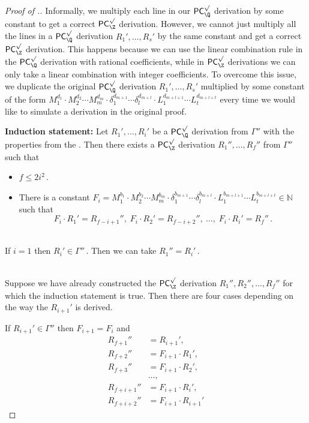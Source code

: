 \documentclass{toc}
\begin{document}
\begin{proof}[Proof of .]
Informally, we multiply each line in our  $\mathsf{PC}_{\Q}^{\surd}$ derivation by some constant to get a correct $\mathsf{PC}_{\Z}^{\surd}$ derivation. However, we cannot just multiply all the lines in a $\mathsf{PC}_{\Q}^{\surd}$ derivation %
$R_1', \ldots, R_s'$ %
 by the same constant and get a correct  $\mathsf{PC}_{\Z}^{\surd}$ derivation. This happens because we can use the linear combination rule in the  $\mathsf{PC}_{\Q}^{\surd}$ derivation with rational coefficients, while in   $\mathsf{PC}_{\Z}^{\surd}$ derivations we can only take a linear combination with integer coefficients. To overcome this issue, we duplicate the original $\mathsf{PC}_{\Q}^{\surd}$ derivation %
$R_1', \ldots, R_s'$ %
  multiplied by some constant of the form $M_1^{d_1} \cdot M_2^{d_2} \cdots M_m^{d_m} \cdot \delta_1^{d_{m + 1}} \cdots \delta_l^{d_{m + l}} \cdot  L_1^{d_{m + l + 1}} \cdots L_t^{d_{m + l + t}}$  every time we would like to simulate a derivation in the original proof.
%

\noindent\textbf{Induction statement:} Let %
$R_1', \ldots, R_i'$ %
 be a $\mathsf{PC}_{\Q}^{\surd}$ derivation from $\Gamma''$ with the properties from the . Then there exists a $\mathsf{PC}_{\Z}^{\surd}$ derivation %
$R_1'', \ldots, R_f''$ %
 from $\Gamma''$ such that
\begin{itemize}
    \item %
$f \le 2 i^2\,.$ %
    \item There is a constant $F_i = M_1^{b_1} \cdot M_2^{b_2} \cdots M_m^{b_m} \cdot \delta_1^{b_{m + 1}} \cdots \delta_l^{b_{m + l}} \cdot  L_1^{b_{m + l + 1}} \cdots L_t^{b_{m + l + t}} \in \mathbb{N}$ such that %
    $$
    F_i \cdot R_1' = R_{f - i + 1}'', \; F_i \cdot R_2' = R_{f - i + 2}'', \: \ldots, \;  F_i \cdot R_i' = R_{f}''\,. %
    $$
\end{itemize}


\mbox{}\\  If $i = 1$ then %
$R_i' \in \Gamma''\,.$ %
 Then we can take %
$R_{1}'' = R_i'\,.$ %

\mbox{}\\  Suppose we have already constructed the $\mathsf{PC}_{\Z}^{\surd}$ derivation %
$R_1'', R_2'', \ldots, R_{f}''$ %
 for which the induction statement is true. Then there are four cases depending on the way the $R_{i + 1}'$ is derived.

 If $R_{i + 1}' \in \Gamma''$ then $F_{i + 1} = F_i$ and
\begin{align*}
R_{f + 1}'' &= R_{i + 1}', \\ R_{f + 2}'' &= F_{i + 1} \cdot R_1', \\ R_{f + 3}'' &= F_{i + 1} \cdot R_2', \\ &\ldots, \\  R_{f + i + 1}'' &= F_{i + 1} \cdot R_i', \\ R_{f + i + 2}'' &= F_{i + 1} \cdot R_{i + 1}'  
\end{align*}


\end{proof}
\end{document}
